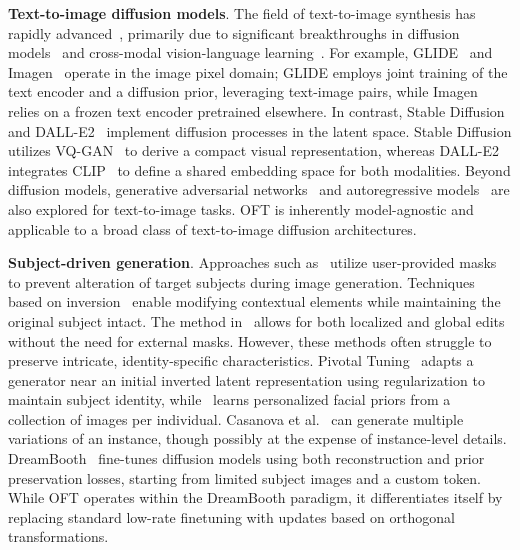 \textbf{Text-to-image diffusion models}. The field of text-to-image synthesis has rapidly advanced~\cite{saharia2022photorealistic,ramesh2022hierarchical,rombach2022high,gu2022vector,nichol2022glide}, primarily due to significant breakthroughs in diffusion models~\cite{ho2020denoising,song2021score,song2021denoising,dhariwal2021diffusion} and cross-modal vision-language learning~\cite{su2020vlbert,lu2019vilbert,radford2021learning,wang2021simvlm,li2022blip,li2023blip,alayrac2022flamingo,schuhmann2022laion}. For example, GLIDE~\cite{nichol2022glide} and Imagen~\cite{saharia2022photorealistic} operate in the image pixel domain; GLIDE employs joint training of the text encoder and a diffusion prior, leveraging text-image pairs, while Imagen relies on a frozen text encoder pretrained elsewhere. In contrast, Stable Diffusion~\cite{rombach2022high} and DALL-E2~\cite{ramesh2022hierarchical} implement diffusion processes in the latent space. Stable Diffusion utilizes VQ-GAN~\cite{esser2021taming} to derive a compact visual representation, whereas DALL-E2 integrates CLIP~\cite{radford2021learning} to define a shared embedding space for both modalities. Beyond diffusion models, generative adversarial networks~\cite{reed2016generative,zhang2017stackgan,xu2018attngan,li2019controllable} and autoregressive models~\cite{ramesh2021zero,ding2021cogview,wu2022nuwa,yuscaling} are also explored for text-to-image tasks. OFT is inherently model-agnostic and applicable to a broad class of text-to-image diffusion architectures.

\textbf{Subject-driven generation}. Approaches such as~\cite{avrahami2022blended,nichol2022glide} utilize user-provided masks to prevent alteration of target subjects during image generation. Techniques based on inversion~\cite{choi2021ilvr,dhariwal2021diffusion,ramesh2022hierarchical,gal2022image} enable modifying contextual elements while maintaining the original subject intact. The method in~\cite{hertz2022prompt} allows for both localized and global edits without the need for external masks. However, these methods often struggle to preserve intricate, identity-specific characteristics. Pivotal Tuning~\cite{roich2022pivotal} adapts a generator near an initial inverted latent representation using regularization to maintain subject identity, while~\cite{nitzan2022mystyle} learns personalized facial priors from a collection of images per individual. Casanova et al.~\cite{casanova2021instance} can generate multiple variations of an instance, though possibly at the expense of instance-level details. DreamBooth~\cite{ruiz2023dreambooth} fine-tunes diffusion models using both reconstruction and prior preservation losses, starting from limited subject images and a custom token. While OFT operates within the DreamBooth paradigm, it differentiates itself by replacing standard low-rate finetuning with updates based on orthogonal transformations.

